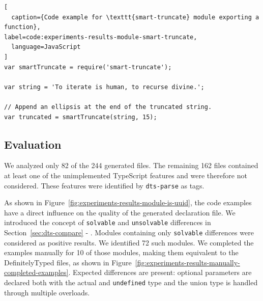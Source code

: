 \documentclass[english,cleveref,autoref,submission]{programming}
\newcommand{\secref}[1]{Section~\ref{#1} - \nameref{#1}}
\newcommand{\figref}[1]{Figure~\ref{#1}}
\begin{document}
\begin{lstlisting}[
  caption={Code example for \texttt{smart-truncate} module exporting a function},
label=code:experiments-results-module-smart-truncate,
  language=JavaScript
]
var smartTruncate = require('smart-truncate');

var string = 'To iterate is human, to recurse divine.';

// Append an ellipsis at the end of the truncated string.
var truncated = smartTruncate(string, 15);
\end{lstlisting}

\subsection{Evaluation}
\label{sec:experiments-evaluation}
We analyzed only 82 of the 244 generated files. The remaining 162 files contained at least one of the unimplemented TypeScript features and were therefore not considered. These features were identified by \texttt{dts-parse} as tags.

As shown in \figref{fig:experiments-results-module-is-uuid}, the code examples have a direct influence on the quality of the generated declaration file. We introduced the concept of \texttt{solvable} and \texttt{unsolvable} differences in \secref{sec:dts-compare}. Modules containing only \texttt{solvable} differences were considered as positive results. We identified 72 such modules. We completed the examples manually for 10 of those modules, making them equivalent to the DefinitelyTyped files, as shown in \figref{fig:experiments-results-manually-completed-examples}. Expected differences are present: optional parameters are declared both with the actual and \texttt{undefined} type and the union type is handled through multiple overloads.
\end{document}
